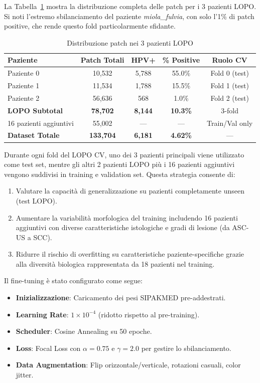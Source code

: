 	La Tabella~\ref{tab:lopo_patient_distribution} mostra la distribuzione completa delle patch per i 3 pazienti LOPO. Si noti l'estremo sbilanciamento del paziente \textit{miola\_fulvia}, con solo l'1\% di patch positive, che rende questo fold particolarmente sfidante.
	
	\begin{table}[h]
		\centering
		\caption{Distribuzione patch nei 3 pazienti LOPO}
		\label{tab:lopo_patient_distribution}
		\begin{tabular}{lcccc}
			\toprule
			\textbf{Paziente} & \textbf{Patch Totali} & \textbf{HPV+} & \textbf{\% Positive} & \textbf{Ruolo CV} \\
			\midrule
			Paziente 0 & 10,532 & 5,788 & 55.0\% & Fold 0 (test) \\
			Paziente 1 & 11,534 & 1,788 & 15.5\% & Fold 1 (test) \\
			Paziente 2 & 56,636 & 568 & 1.0\% & Fold 2 (test) \\
			\midrule
			\textbf{LOPO Subtotal} & \textbf{78,702} & \textbf{8,144} & \textbf{10.3\%} & 3-fold \\
			\midrule
			16 pazienti aggiuntivi & 55,002 & — & — & Train/Val only \\
			\midrule
			\textbf{Dataset Totale} & \textbf{133,704} & \textbf{6,181} & \textbf{4.62\%} & — \\
			\bottomrule
		\end{tabular}
	\end{table}
	
	Durante ogni fold del LOPO CV, uno dei 3 pazienti principali viene utilizzato come test set, mentre gli altri 2 pazienti LOPO più i 16 pazienti aggiuntivi vengono suddivisi in training e validation set. Questa strategia consente di:
	
	\begin{enumerate}
		\item Valutare la capacità di generalizzazione su pazienti completamente unseen (test LOPO).
		\item Aumentare la variabilità morfologica del training includendo 16 pazienti aggiuntivi con diverse caratteristiche istologiche e gradi di lesione (da ASC-US a SCC).
		\item Ridurre il rischio di overfitting su caratteristiche paziente-specifiche grazie alla diversità biologica rappresentata da 18 pazienti nel training.
	\end{enumerate}
	
	Il fine-tuning è stato configurato come segue:
	\begin{itemize}
		\item \textbf{Inizializzazione}: Caricamento dei pesi SIPAKMED pre-addestrati.
		\item \textbf{Learning Rate}: $1 \times 10^{-4}$ (ridotto rispetto al pre-training).
		\item \textbf{Scheduler}: Cosine Annealing su 50 epoche.
		\item \textbf{Loss}: Focal Loss con $\alpha=0.75$ e $\gamma=2.0$ per gestire lo sbilanciamento.
		\item \textbf{Data Augmentation}: Flip orizzontale/verticale, rotazioni casuali, color jitter.
	\end{itemize}
	
